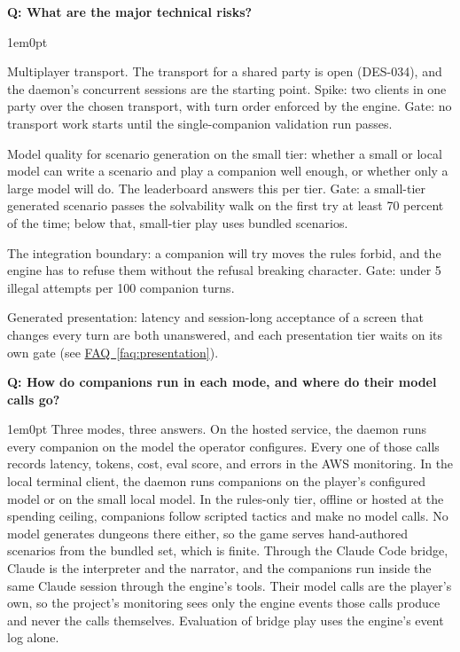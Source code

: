 \documentclass[11pt,letterpaper]{article}
\newcounter{faqnum}
\newenvironment{faqpair}[1]{%
  \needspace{4\baselineskip}\vspace{0.5em}\refstepcounter{faqnum}%
  \noindent\textbf{\color{SectionBlue}Q\thefaqnum: #1}\par\nopagebreak[4]%
  \vspace{0.2em}\begin{adjustwidth}{1em}{0pt}\setlength{\parindent}{0pt}%
}{\end{adjustwidth}\vspace{0.5em}}
\newcommand{\faqref}[1]{\hyperref[#1]{FAQ~\ref*{#1}}}
\begin{document}
\begin{faqpair}{What are the major technical risks?}
Multiplayer transport. The transport for a shared party is open (DES-034),
and the daemon's concurrent sessions are the starting point. Spike: two
clients in one party over the chosen transport, with turn order enforced by
the engine. Gate: no transport work starts until the single-companion
validation run passes.

Model quality for scenario generation on the small tier: whether a small or
local model can write a scenario and play a companion well enough, or
whether only a large model will do. The leaderboard answers this per tier.
Gate: a small-tier generated scenario passes the solvability walk on the
first try at least 70 percent of the time; below that, small-tier play uses
bundled scenarios.

The integration boundary: a companion will try moves the rules forbid, and
the engine has to refuse them without the refusal breaking character. Gate:
under 5 illegal attempts per 100 companion turns.

Generated presentation: latency and session-long acceptance of a screen
that changes every turn are both unanswered, and each presentation tier
waits on its own gate (see \faqref{faq:presentation}).
\end{faqpair}

\begin{faqpair}{How do companions run in each mode, and where do their model calls go?}\label{faq:modes}
Three modes, three answers. On the hosted service, the daemon runs every
companion on the model the operator configures. Every one of those calls
records latency, tokens, cost, eval score, and errors in the AWS
monitoring. In the local terminal client, the daemon runs companions on the
player's configured model or on the small local model. In the rules-only
tier, offline or hosted at the spending ceiling, companions follow scripted
tactics and make no model calls. No model generates dungeons there either,
so the game serves hand-authored scenarios from the bundled set, which is
finite. Through
the Claude Code bridge, Claude is the interpreter and the narrator, and the
companions run inside the same Claude session through the engine's tools.
Their model calls are the player's own, so the project's monitoring sees
only the engine events those calls produce and never the calls themselves.
Evaluation of bridge play uses the engine's event log alone.
\end{faqpair}
\end{document}
